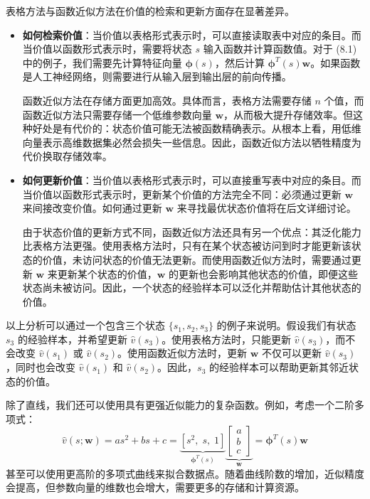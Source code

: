\documentclass[UTF8]{article}
\begin{document}
表格方法与函数近似方法在价值的检索和更新方面存在显著差异。

\begin{itemize}
    \item \textbf{如何检索价值}：当价值以表格形式表示时，可以直接读取表中对应的条目。而当价值以函数形式表示时，需要将状态 $s$ 输入函数并计算函数值。对于 (8.1) 中的例子，我们需要先计算特征向量 $\boldsymbol{\phi}(s)$，然后计算 $\boldsymbol{\phi}^T(s)\boldsymbol{w}$。如果函数是人工神经网络，则需要进行从输入层到输出层的前向传播。

    函数近似方法在存储方面更加高效。具体而言，表格方法需要存储 $n$ 个值，而函数近似方法只需要存储一个低维参数向量 $\boldsymbol{w}$，从而极大提升存储效率。但这种好处是有代价的：状态价值可能无法被函数精确表示。从根本上看，用低维向量表示高维数据集必然会损失一些信息。因此，函数近似方法以牺牲精度为代价换取存储效率。
    
    \item \textbf{如何更新价值}：当价值以表格形式表示时，可以直接重写表中对应的条目。而当价值以函数形式表示时，更新某个价值的方法完全不同：必须通过更新 $\boldsymbol{w}$ 来间接改变价值。如何通过更新 $\boldsymbol{w}$ 来寻找最优状态价值将在后文详细讨论。

    由于状态价值的更新方式不同，函数近似方法还具有另一个优点：其泛化能力比表格方法更强。使用表格方法时，只有在某个状态被访问到时才能更新该状态的价值，未访问状态的价值无法更新。而使用函数近似方法时，需要通过更新 $\boldsymbol{w}$ 来更新某个状态的价值，$\boldsymbol{w}$ 的更新也会影响其他状态的价值，即便这些状态尚未被访问。因此，一个状态的经验样本可以泛化并帮助估计其他状态的价值。
\end{itemize}

以上分析可以通过一个包含三个状态 $\{s_1, s_2, s_3\}$ 的例子来说明。假设我们有状态 $s_3$ 的经验样本，并希望更新 $\hat{v}(s_3)$。使用表格方法时，只能更新 $\hat{v}(s_3)$，而不会改变 $\hat{v}(s_1)$ 或 $\hat{v}(s_2)$。使用函数近似方法时，更新 $\boldsymbol{w}$ 不仅可以更新 $\hat{v}(s_3)$，同时也会改变 $\hat{v}(s_1)$ 和 $\hat{v}(s_2)$。因此，$s_3$ 的经验样本可以帮助更新其邻近状态的价值。

除了直线，我们还可以使用具有更强近似能力的复杂函数。例如，考虑一个二阶多项式：
\[
\hat{v}(s; \boldsymbol{w}) = a s^2 + b s + c = \underbrace{[s^2, \; s, \; 1]}_{\boldsymbol{\phi}^T(s)} \underbrace{\begin{bmatrix} a \\ b \\ c \end{bmatrix}}_{\boldsymbol{w}} = \boldsymbol{\phi}^T(s) \boldsymbol{w}
\tag{8.2}
\]
甚至可以使用更高阶的多项式曲线来拟合数据点。随着曲线阶数的增加，近似精度会提高，但参数向量的维数也会增大，需要更多的存储和计算资源。
\end{document}
